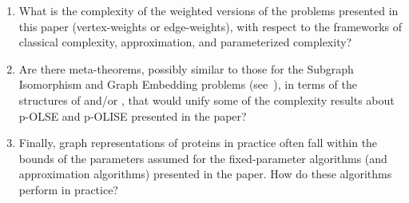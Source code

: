 \documentclass[11pt]{article}
\begin{document}
\begin{enumerate}
  \item  What is the complexity of the weighted versions of the problems presented in this paper (vertex-weights or edge-weights), with respect to the frameworks of classical complexity, approximation, and parameterized complexity?
   \item Are there meta-theorems, possibly similar to those for the {\sc Subgraph Isomorphism} and {\sc Graph Embedding} problems (see~\cite{grohebook}), in terms of the structures of  and/or , that would unify some of the complexity results about p-OLSE and p-OLISE presented in the paper?

   \item Finally, graph representations of proteins in practice often fall within the bounds of the parameters assumed for the fixed-parameter algorithms (and approximation algorithms) presented in the paper. How do these algorithms perform in practice?

  \end{enumerate}



\end{document}
